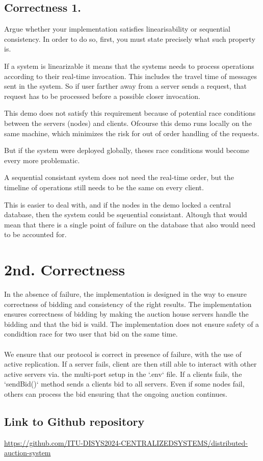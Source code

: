 \documentclass[a4paper,11pt]{article}
\begin{document}
\subsection{Correctness 1.}
Argue whether your implementation satisfies linearisability or sequential consistency. In order to do so, first, you must state precisely what such property is.


If a system is linearizable it means that the systems needs to process operations according to their real-time invocation.
This includes the travel time of messages sent in the system. So if user farther away from a server sends a request,
that request has to be processed before a possible closer invocation.

This demo does not satisfy this requirement because of potential race conditions between the servers (nodes) and clients.
Ofcourse this demo runs locally on the same machine, which minimizes the risk for out of order handling of the requests.

But if the system were deployed globally, theses race conditions would become every more problematic.


A sequential consistant system does not need the real-time order, but the timeline of operations still needs to be the same on every client.

This is easier to deal with, and if the nodes in the demo locked a central database, then the system could be sqeuential consistant.
Altough that would mean that there is a single point of failure on the database that also would need to be accounted for.

\section{2nd. Correctness}
In the absence of failure, the implementation is designed in the way to ensure correctness of bidding and consistency of the right results. 
The implementation ensures correctness of bidding by making the auction house servers handle the bidding and that the bid is vaild. The implementation does not ensure safety of a condidtion race for two user that bid on the same time.
\\
\\
We ensure that our protocol is correct in presence of failure, with the use of active replication. 
If a server fails, client are then still able to interact with other active servers via. the multi-port setup in the `.env` file.
If a clients fails, the `sendBid()` method sends a clients bid to all servers. Even if some nodes fail, others can process the bid ensuring that the ongoing auction continues.
\\

\subsection*{Link to Github repository}

\href{https://github.com/ITU-DISYS2024-CENTRALIZEDSYSTEMS/distributed-auction-system}{https://github.com/ITU-DISYS2024-CENTRALIZEDSYSTEMS/distributed-auction-system}
\end{document}
